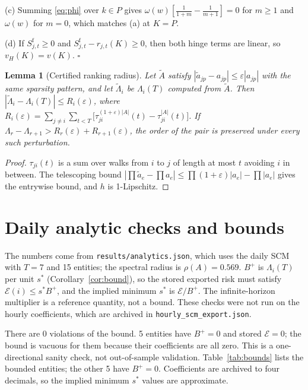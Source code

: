 \documentclass[referee,pdflatex,sn-mathphys-ay]{sn-jnl}
\theoremstyle{thmstyleone}%
\newtheorem{lemma}{Lemma}%
\theoremstyle{thmstyletwo}%
\theoremstyle{thmstylethree}%
\begin{document}
\begin{appendices}
(c) Summing \eqref{eq:phi} over $k\in P$ gives $\omega(w)[\tfrac1{1+m}-\tfrac1{m+1}]=0$ for $m\ge1$ and $\omega(w)$ for $m=0$, which matches (a) at $K=P$.

(d) If $S^{\mathrm f}_{j,t}\ge0$ and $S^{\mathrm f}_{j,t}-r_{j,t}(K)\ge0$, then both hinge terms are linear, so
$v_H(K)=v(K)$. \hfill$\square$

\begin{lemma}[Certified ranking radius]
\label{lem:radius}
Let $\tilde A$ satisfy $|\tilde a_{jp}-a_{jp}|\le\varepsilon|a_{jp}|$ with the same sparsity
pattern, and let $\tilde\Lambda_i$ be $\Lambda_i(T)$ computed from $\tilde A$. Then
$|\tilde\Lambda_i-\Lambda_i(T)|\le R_i(\varepsilon)$, where
$R_i(\varepsilon)=\sum_{j\ne i}\sum_{t<T}\big[\tau^{(1+\varepsilon)|A|}_{ji}(t)-\tau^{|A|}_{ji}(t)\big]$.
If $\Lambda_r-\Lambda_{r+1}>R_r(\varepsilon)+R_{r+1}(\varepsilon)$, the order of the pair is
preserved under every such perturbation.
\end{lemma}
\begin{proof}
$\tau_{ji}(t)$ is a sum over walks from $i$ to $j$ of length at most $t$ avoiding $i$ in between. The telescoping bound $|\prod\tilde a_e-\prod a_e|\le\prod(1+\varepsilon)|a_e|-\prod|a_e|$ gives the entrywise bound, and $h$ is 1-Lipschitz.
\end{proof}

\section{Daily analytic checks and bounds}\label{app:bounds}
\setcounter{table}{0}

The numbers come from \texttt{results/analytics.json}, which uses the daily SCM with $T=7$ and 15 entities; the
spectral radius is $\rho(A)=0.569$. $B^+$ is $\Lambda_i(T)$ per unit $s^\ast$ (Corollary~\ref{cor:bound}), so the stored
exported risk must satisfy $\mathcal{E}(i)\le s^\ast B^+$, and the implied minimum $s^\ast$ is $\mathcal{E}/B^+$. The
infinite-horizon multiplier is a reference quantity, not a bound. These checks were not
run on the hourly coefficients, which are archived in \texttt{hourly\_scm\_export.json}.

There are 0 violations of the bound. 5 entities have $B^+=0$ and stored $\mathcal{E}=0$; the bound is vacuous for them
because their coefficients are all zero. This is a one-directional sanity check, not out-of-sample validation. Table~\ref{tab:bounds} lists the bounded entities; the other 5 have $B^+=0$. Coefficients are archived to four decimals, so the implied minimum
$s^\ast$ values are approximate.


\end{appendices}
\end{document}
